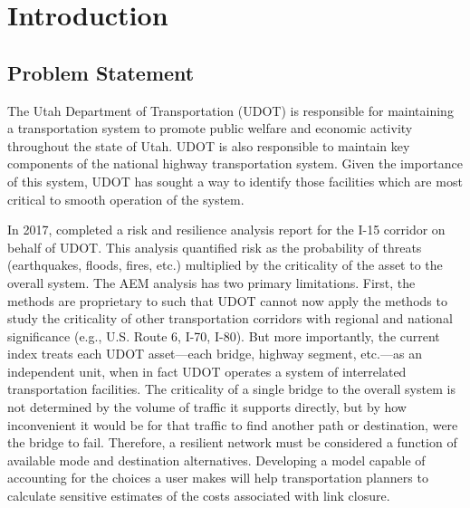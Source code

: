 \chapter{Introduction}
\label{chp:chapter1}
\graphicspath{{figures/}{figures/chapter1/}}

\section{Problem Statement}
The Utah Department of Transportation (UDOT) is responsible for maintaining a
transportation system to promote public welfare and economic activity throughout
the state of Utah. UDOT is also responsible to maintain key components of the
national highway transportation system. Given the importance of this system,
UDOT has sought a way to identify those facilities which are most critical to smooth
operation of the system.

In 2017, \citet{aem2017} completed a risk and resilience analysis report for the I-15 corridor on behalf of
UDOT. This analysis quantified risk as the probability of threats (earthquakes, floods, fires,
etc.) multiplied by the criticality of the asset to the overall system. The AEM
analysis has two primary limitations. First, the methods are proprietary to
\citet{aem2017} such that UDOT cannot now apply the methods to study the criticality of other transportation
corridors with regional and national significance (e.g., U.S. Route 6, I-70, I-80). But more
importantly, the current index treats each UDOT asset---each bridge, highway segment, etc.---as an
independent unit, when in fact UDOT operates a system of interrelated transportation facilities. The criticality
of a single bridge to the overall system is not determined by the volume of traffic it supports
directly, but by how inconvenient it would be for that traffic to find another path or destination,
were the bridge to fail. Therefore, a resilient network must be considered a function of
available mode and destination alternatives. Developing a model capable of accounting for the choices a user makes will help
transportation planners to calculate sensitive estimates of the costs associated with link closure.

